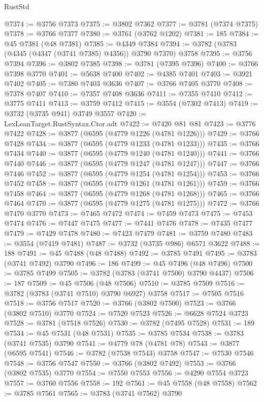 \begin{lexlean}{RustStd}
\begin{coremodule}
@7374 := @3756 @7373
@7375 := @3802 @7362
@7377 := @3781 (@7374 @7375)
@7378 := @3766 @7377
@7380 := @3761 (@3762 @1202)
@7381 := 185
@7384 := @45 @7381 (@48 @7381)
@7385 := @4349 @7384
@7394 := @3782 (@3783 (@4345 (@4347 (@3741 @7385) @4356)) @3790 @7370) @3758
@7395 := @3756 @7394
@7396 := @3802 @7385
@7398 := @3781 (@7395 @7396)
@7400 := @3766 @7398 @3770
@7401 := @5638 @7400
@7402 := @4385 @7401
@7403 := @3921 @7402
@7405 := @7380 @7403 @3636
@7407 := @3766 @7405 @3770
@7408 := @7378 @7407
@7410 := @7357 @7408 @3636
@7411 := @7355 @7410
@7412 := @3775 @7411
@7413 := @3759 @7412
@7415 := @3554 (@7302 @7413)
@7419 := @3732 (@3735 @941) @3749 @3557
@7420 := LexLeanTarget.RustSyntax.Ctor.adt
@7422 := @7420 @81 @81
@7423 := @3776 @7422
@7428 := @3877 (@6595 (@4779 @1226 (@4781 @1226)))
@7429 := @3766 @7428
@7434 := @3877 (@6595 (@4779 @1233 (@4781 @1233)))
@7435 := @3766 @7434
@7440 := @3877 (@6595 (@4779 @1240 (@4781 @1240)))
@7441 := @3766 @7440
@7446 := @3877 (@6595 (@4779 @1247 (@4781 @1247)))
@7447 := @3766 @7446
@7452 := @3877 (@6595 (@4779 @1254 (@4781 @1254)))
@7453 := @3766 @7452
@7458 := @3877 (@6595 (@4779 @1261 (@4781 @1261)))
@7459 := @3766 @7458
@7464 := @3877 (@6595 (@4779 @1268 (@4781 @1268)))
@7465 := @3766 @7464
@7470 := @3877 (@6595 (@4779 @1275 (@4781 @1275)))
@7472 := @3766 @7470 @3770
@7473 := @7465 @7472
@7474 := @7459 @7473
@7475 := @7453 @7474
@7476 := @7447 @7475
@7477 := @7441 @7476
@7478 := @7435 @7477
@7479 := @7429 @7478
@7480 := @7423 @7479
@7481 := @3759 @7480
@7483 := @3554 (@7419 @7481)
@7487 := @3732 (@3735 @986) @6571 @3622
@7488 := 188
@7491 := @45 @7488 (@48 @7488)
@7492 := @3785 @7491
@7495 := @3783 (@3741 @7492) @3790
@7496 := 186
@7499 := @45 @7496 (@48 @7496)
@7500 := @3785 @7499
@7505 := @3782 (@3783 (@3741 @7500) @3790 @4437)
@7506 := 187
@7509 := @45 @7506 (@48 @7506)
@7510 := @3785 @7509
@7516 := @3782 (@3783 (@3741 @7510) @3790 @6927) @3758
@7517 := @7505 @7516
@7518 := @3756 @7517
@7520 := @3766 (@3802 @7500)
@7523 := @3766 (@3802 @7510) @3770
@7524 := @7520 @7523
@7526 := @6628 @7524 @3723
@7528 := @3781 (@7518 @7526)
@7530 := @3782 (@7495 @7528)
@7531 := 189
@7534 := @45 @7531 (@48 @7531)
@7535 := @3785 @7534
@7538 := @3783 (@3741 @7535) @3790
@7541 := @4779 @78 (@4781 @78)
@7543 := @3877 (@6595 @7541)
@7546 := @3782 (@7538 @7543) @3758
@7547 := @7530 @7546
@7548 := @3756 @7547
@7550 := @3766 (@3802 @7492)
@7553 := @3766 (@3802 @7535) @3770
@7554 := @7550 @7553
@7556 := @4290 @7554 @3723
@7557 := @3760 @7556
@7558 := 192
@7561 := @45 @7558 (@48 @7558)
@7562 := @3785 @7561
@7565 := @3783 (@3741 @7562) @3790

\end{coremodule}
\end{lexlean}
